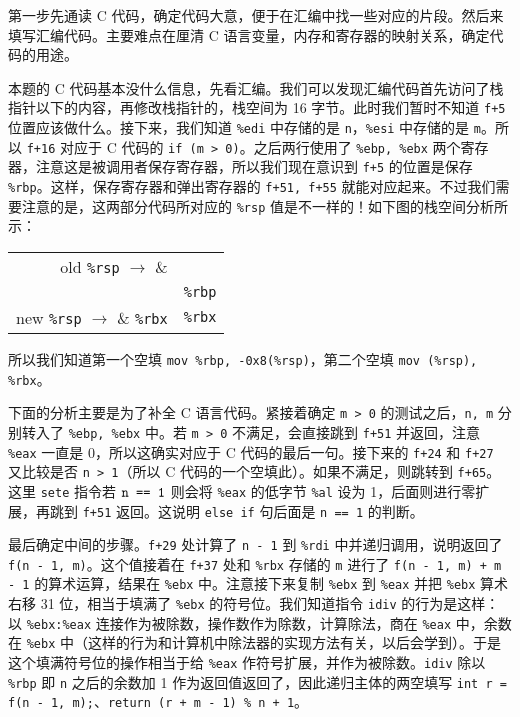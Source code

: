 \begin{problems}
        第一步先通读 C 代码，确定代码大意，便于在汇编中找一些对应的片段。然后来填写汇编代码。主要难点在厘清 C 语言变量，内存和寄存器的映射关系，确定代码的用途。

        本题的 C 代码基本没什么信息，先看汇编。我们可以发现汇编代码首先访问了栈指针以下的内容，再修改栈指针的，栈空间为 16 字节。此时我们暂时不知道 \verb|f+5| 位置应该做什么。接下来，我们知道 \verb|%edi| 中存储的是 \verb|n|，\verb|%esi| 中存储的是 \verb|m|。所以 \verb|f+16| 对应于 C 代码的 \verb|if (m > 0)|。之后两行使用了 \verb|%ebp, %ebx| 两个寄存器，注意这是被调用者保存寄存器，所以我们现在意识到 \verb|f+5| 的位置是保存 \verb|%rbp|。这样，保存寄存器和弹出寄存器的 \verb|f+51, f+55| 就能对应起来。不过我们需要注意的是，这两部分代码所对应的 \verb|%rsp| 值是不一样的！如下图的栈空间分析所示：
        \begin{table}[H]
            \centering
            \begin{tabular}{r|c|}
                \cline{2-2}
                old \verb|%rsp| $\to$ &  \\ \cline{2-2} 
                & \verb|%rbp| \\ \cline{2-2} 
                new \verb|%rsp| $\to$ & \verb|%rbx| \\ \cline{2-2} 
            \end{tabular}
        \end{table}
        所以我们知道第一个空填 \verb|mov %rbp, -0x8(%rsp)|，第二个空填 \verb|mov (%rsp), %rbx|。

        下面的分析主要是为了补全 C 语言代码。紧接着确定 \verb|m > 0| 的测试之后，\verb|n, m| 分别转入了 \verb|%ebp, %ebx| 中。若 \verb|m > 0| 不满足，会直接跳到 \verb|f+51| 并返回，注意 \verb|%eax| 一直是 0，所以这确实对应于 C 代码的最后一句。接下来的 \verb|f+24| 和 \verb|f+27| 又比较是否 \verb|n > 1|（所以 C 代码的一个空填此）。如果不满足，则跳转到 \verb|f+65|。这里 \verb|sete| 指令若 $\verb|n == 1|$ 则会将 \verb|%eax| 的低字节 \verb|%al| 设为 1，后面则进行零扩展，再跳到 \verb|f+51| 返回。这说明 \verb|else if| 句后面是 \verb|n == 1| 的判断。

        最后确定中间的步骤。\verb|f+29| 处计算了 \verb|n - 1| 到 \verb|%rdi| 中并递归调用，说明返回了 \verb|f(n - 1, m)|。这个值接着在 \verb|f+37| 处和 \verb|%rbx| 存储的 \verb|m| 进行了 \verb|f(n - 1, m) + m - 1| 的算术运算，结果在 \verb|%ebx| 中。注意接下来复制 \verb|%ebx| 到 \verb|%eax| 并把 \verb|%ebx| 算术右移 31 位，相当于填满了 \verb|%ebx| 的符号位。我们知道指令 \verb|idiv| 的行为是这样：以 \verb|%ebx:%eax| 连接作为被除数，操作数作为除数，计算除法，商在 \verb|%eax| 中，余数在 \verb|%ebx| 中（这样的行为和计算机中除法器的实现方法有关，以后会学到）。于是这个填满符号位的操作相当于给 \verb|%eax| 作符号扩展，并作为被除数。\verb|idiv| 除以 \verb|%rbp| 即 \verb|n| 之后的余数加 1 作为返回值返回了，因此递归主体的两空填写 \verb|int r = f(n - 1, m);|、\verb|return (r + m - 1) % n + 1|。


\end{problems}
